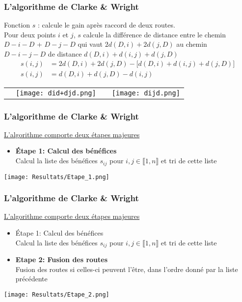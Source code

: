 \documentclass[10pt]{beamer}
\begin{document}
	\begin{frame}
		\frametitle{L'algorithme de Clarke \& Wright}
		\begin{definition}
			Fonction $s$ : calcule le gain après raccord de deux routes. \\Pour deux points $i$ et $j$, $s$ calcule la différence de distance entre le chemin \\$D-i-D$ + $D-j-D$ qui vaut $2d(D,i) + 2d(j,D)$ au chemin\\$D-i-j-D$ de distance $d(D,i) + d(i,j) + d(j,D)$
		\begin{align*}
			s(i,j) &= 2d(D,i) + 2d(j,D) - \lbrack d(D,i) + d(i,j) + d(j,D)\rbrack \\
			s(i,j) &= d(D,i) + d(j,D) - d(i,j)
		\end{align*}
		\end{definition}
		\pause
		\begin{tabular}{cccc}
			\;\;\;\;\;\;\;
			&
			\texttt{[image: did+djd.png]}
			&
			\;\;\;\;\;\;\;	
			\pause		
			&
			\texttt{[image: dijd.png]}			
		\end{tabular}
	\end{frame}

   \begin{frame}
	\frametitle{L'algorithme de Clarke \& Wright}
		\underline{L'algorithme comporte deux étapes majeures}
		\begin{itemize}[label=—]
			\item \textbf{Étape 1: Calcul des bénéfices}
			\ \\ Calcul la liste des bénéfices $s_{ij}$ pour $i,j \in \llbracket 1,n \rrbracket$ et tri de cette liste
		\end{itemize}
		\begin{center}
			\texttt{[image: Resultats/Etape\_1.png]}
		\end{center}
	\end{frame}

	\begin{frame}
		\frametitle{L'algorithme de Clarke \& Wright}
		\underline{L'algorithme comporte deux étapes majeures}
		\begin{itemize}[label=—]
			\item Étape 1: Calcul des bénéfices
			\ \\ Calcul la liste des bénéfices $s_{ij}$ pour $i,j \in \llbracket 1,n \rrbracket$ et tri de cette liste
			\item \textbf{Etape 2: Fusion des routes}
			\ \\ Fusion des routes si celles-ci peuvent l'être, dans l'ordre donné par la liste précédente
		\end{itemize}
		\begin{center}
			\texttt{[image: Resultats/Etape\_2.png]}
		\end{center}
	\end{frame}
\end{document}
